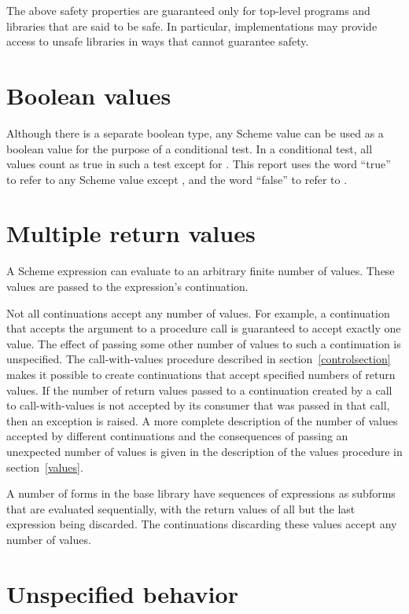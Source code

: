 The above safety properties are guaranteed only for top-level programs
and libraries that are said to be safe.  In particular,
implementations may provide access to unsafe libraries in ways that
cannot guarantee safety.

\section{Boolean values}
\label{booleanvaluessection}

Although there is a separate boolean type, any Scheme value can be
used as a boolean value for the purpose of a conditional test.  In a
conditional test, all values count as true in such a test except for
\schfalse{}.  This report uses the word ``true'' to refer to any
Scheme value except \schfalse{}, and the word ``false'' to refer to
\schfalse{}.  

\section{Multiple return values}
\label{multiplereturnvaluessection}

A Scheme expression can evaluate to an arbitrary finite number of
values.  These values are passed to the expression's continuation.

Not all continuations accept any number of values. For example, a continuation that
accepts the argument to a procedure call is guaranteed to accept
exactly one value.  The effect of passing some other number of values
to such a continuation is unspecified.  The {\cf call-with-values}
procedure
described in section~\ref{controlsection} makes it possible to create
continuations that accept specified numbers of return values.
If the number of
return values passed to a continuation created by a call to
{\cf call-with-values} is not accepted by its consumer
that was passed in that call, then an exception is raised.
A more complete description of the number of values accepted by
different continuations and the consequences of passing an unexpected
number of values is given in the description of the {\cf values}
procedure in section~\ref{values}.

A number of forms in the base library have sequences of expressions
as subforms that are evaluated sequentially, with the return values of
all but the last expression being discarded.  The continuations
discarding these values accept any number of values.

\section{Unspecified behavior}

